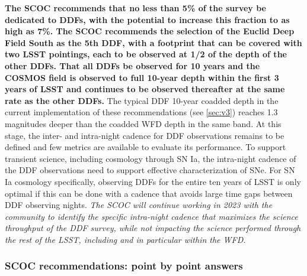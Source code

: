  
{\bf The SCOC recommends that no less than 5\% of the survey be dedicated to DDFs, with the potential to increase this fraction to as high as 7\%. The SCOC recommends the selection of the Euclid Deep Field South as the 5th DDF, with a footprint that can be covered with two LSST pointings, each to be observed at 1/2 of the depth of the other DDFs. That all DDFs be observed for 10 years and the COSMOS field is observed to full 10-year depth within the first 3 years of LSST and continues to be observed thereafter at the same rate as the other DDFs.} The typical DDF 10-year coadded depth in the current implementation of these recommendations (see \autoref{sec:v3}) reaches 1.3 magnitudes deeper than the coadded WFD depth in the same band. At this stage, the inter- and intra-night cadence for DDF observations remains to be defined and few metrics are available to evaluate its performance. %
To support transient science, including cosmology through SN Ia, the intra-night cadence of the DDF observations need to support effective characterization of SNe. For SN Ia cosmology specifically, observing DDFs for the entire ten years of LSST is only optimal  if this can be done with a cadence that avoids large time gaps between DDF observing nights. \emph{The SCOC will continue working in 2023 with the community to identify the specific intra-night cadence that maximizes the science throughput of the DDF survey, while not impacting the science performed through the rest of the LSST, including and in particular within the WFD.}
 
 \subsubsection{SCOC recommendations: point by point answers}\label{sec:ddf_points}
 
